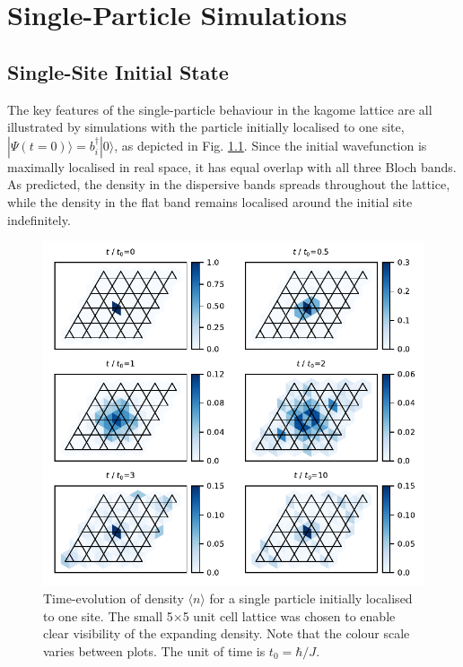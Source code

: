 \chapter{Single-Particle Simulations}\label{Sec:SingleParticleResults}

\section{Single-Site Initial State}

The key features of the single-particle behaviour in the kagome lattice are all illustrated by simulations with the particle initially localised to one site, $|\Psi(t=0)\rangle=b_i^\dag |0\rangle$, as depicted in Fig. \ref{Fig:Single_Particle_Evolution}. Since the initial wavefunction is maximally localised in real space, it has equal overlap with all three Bloch bands. As predicted, the density in the dispersive bands spreads throughout the lattice, while the density in the flat band remains localised around the initial site indefinitely.

\begin{figure}[!p]
    \centering
    \includegraphics[width=\textwidth]{Figures/Single_Particle_Evolution}
    \caption{Time-evolution of density $\langle n \rangle$ for a single particle initially localised to one site. The small 5$\times$5 unit cell lattice was chosen to enable clear visibility of the expanding density. Note that the colour scale varies between plots. The unit of time is $t_0=\hbar/J$.}
    \label{Fig:Single_Particle_Evolution}
\end{figure}

